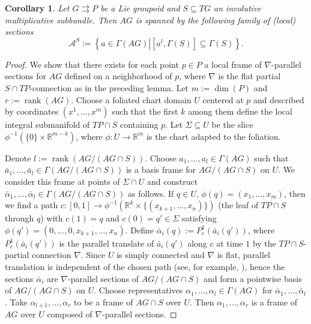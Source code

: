 \documentclass{amsart}
\newtheorem{corollary}[theorem]{Corollary}
\theoremstyle{definition}
\begin{document}
\begin{corollary}\label{cor_of_crucial}
Let $G{{\rightrightarrows}} P$ be a Lie groupoid and $S\subseteq TG$ 
an involutive multiplicative subbundle. Then
$AG$ is spanned by the following family of (local) sections 
\[\mathcal A^S:=\left\{a\in\Gamma(AG)\left| \left[a^l,\Gamma(S)\right]\subseteq \Gamma(S)\right.\right\}.\] 
\end{corollary}
\begin{proof} We show that there 
exists for each point $p\in P$ a local frame 
of $\nabla$-parallel sections for $AG$ defined on a neighborhood of $p$, where 
$\nabla$ is the flat partial $S\cap TP$-connection as in the preceding lemma.
Let $m:=\dim(P)$ and $r:=\operatorname{rank}(AG)$. Choose  a foliated chart domain $U$ centered at $p$ and 
described by
coordinates $(x^1,\dots,x^m)$ such that the first $ k $ among them define the 
local integral submanifold of $TP\cap S$ containing $p$.
Let $\Sigma\subseteq U$ be the slice 
$\phi^{-1}(\{0\}\times {\mathbb{R}}^{m-k})$, where $\phi:U\to{\mathbb{R}}^m$ is
the chart adapted to the foliation.

Denote $l:=\operatorname{rank}(AG/(AG\cap S))$.
Choose $ a_1,\ldots, a_l\in\Gamma(AG)$ such that 
 $\bar a_1,\ldots,\bar a_l\in \Gamma(AG/(AG\cap S))$ 
is a  basis frame for $AG/(AG\cap S)$ on $U$. 
We consider this frame at points of $\Sigma\cap U$ and 
construct $\bar \alpha_1,\ldots, \bar \alpha_l\in\Gamma(AG/(AG\cap S))$
as follows. If  $q\in U$, $\phi(q)=(x_1,\ldots,x_m)$, then we find a path
$c:[0,1]\to\phi^{-1}({\mathbb{R}}^k\times \{(x_{k+1},\ldots,x_n)\})$
(the leaf of $TP\cap S$ through $q$) 
with $c(1)=q$ and $c(0)=q'\in \Sigma$ 
satisfying $\phi(q')=(0,\ldots,0,x_{k+1},\ldots,x_n)$.
Define
 $\bar{\alpha}_i(q):=P_c^1(\bar a_i(q'))$, where 
$P_c^1(\bar a_i(q'))$ is the parallel translate 
of $\bar a_i(q')$ along $c$ at time $1$ by the $TP\cap S$-partial 
connection $\nabla$.
Since $U$ is simply connected and  $\nabla$ is flat,
parallel translation is independent of the chosen path
(see, for example, \cite{Iliev06}), hence the sections
 $\bar\alpha_i$ are $\nabla$-parallel sections of $AG/(AG\cap S)$
and   form a pointwise basis of $AG/(AG\cap S)$ on $U$.
Choose representatives $\alpha_1,\ldots,\alpha_l\in\Gamma(AG)$
for $\bar \alpha_1,\ldots,\bar \alpha_l$. 
 Take $\alpha_{l+1},\ldots,\alpha_r$ to be a frame of $AG\cap S$ over $U$. Then 
$\alpha_{1},\ldots,\alpha_r$ is a frame of $AG$ over $U$
composed of $\nabla$-parallel sections.
\end{proof}
\end{document}
